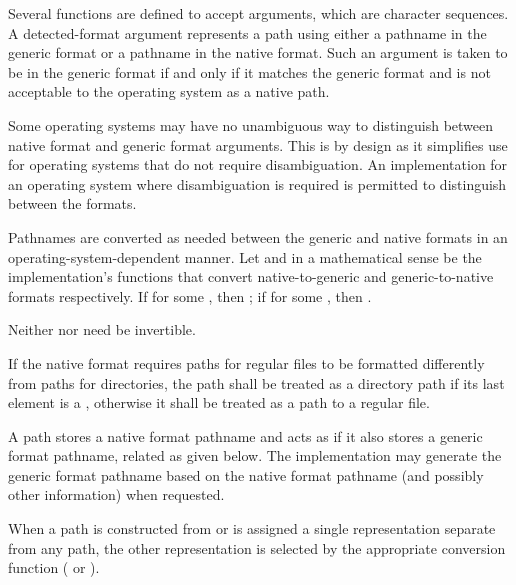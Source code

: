 \pnum
Several functions are defined to accept  arguments,
which are character sequences. A detected-format argument represents a path
using either a pathname in the generic format
or a pathname in the native format.
Such an argument is taken to be in the generic format if and only if
it matches the generic format and is not acceptable to the operating system
as a native path.

\pnum
\begin{note}
Some operating systems may have no unambiguous way to distinguish between native format and generic format arguments.
This is by design as it simplifies use for operating systems that do not require
disambiguation. An implementation for an operating system where disambiguation
is required is permitted to distinguish between the formats.
\end{note}

\pnum
Pathnames are converted as needed between the generic and native formats
in an operating-system-dependent manner.
Let  and  in a mathematical sense
be the implementation's functions that convert native-to-generic
and generic-to-native formats respectively.
If  for some , then ;
if  for some , then .
\begin{note} Neither  nor  need be invertible. \end{note}

\pnum
If the native format requires paths for regular files to be formatted
differently from paths for directories, the path shall be treated as a directory
path if its last element is a ,
otherwise it shall be treated as a path to a regular file.

\pnum
\begin{note}
A path stores a native format pathname
and acts as if it also stores a generic format pathname,
related as given below.
The implementation may generate the generic format pathname
based on the native format pathname (and possibly other information)
when requested.
\end{note}

\pnum
When a path is constructed from or is assigned a single representation
separate from any path, the other representation is selected
by the appropriate conversion function ( or ).

